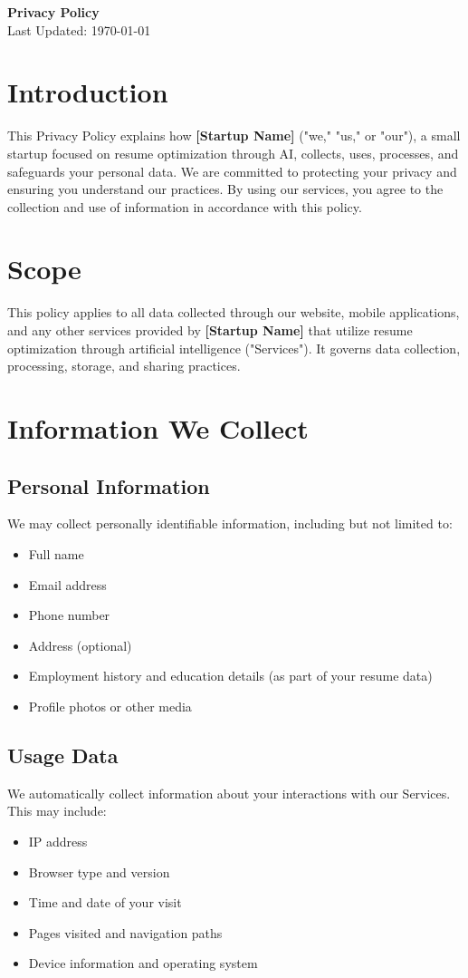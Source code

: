 \documentclass[12pt]{article}
\begin{document}
\begin{center}
    {\LARGE \textbf{Privacy Policy}}\\[0.5cm]
    {\large Last Updated: \today}
\end{center}

\vspace{1cm}

\section{Introduction}
This Privacy Policy explains how \textbf{[Startup Name]} ("we," "us," or "our"), a small startup focused on resume optimization through AI, collects, uses, processes, and safeguards your personal data. We are committed to protecting your privacy and ensuring you understand our practices. By using our services, you agree to the collection and use of information in accordance with this policy.

\section{Scope}
This policy applies to all data collected through our website, mobile applications, and any other services provided by \textbf{[Startup Name]} that utilize resume optimization through artificial intelligence ("Services"). It governs data collection, processing, storage, and sharing practices.

\section{Information We Collect}
\subsection{Personal Information}
We may collect personally identifiable information, including but not limited to:
\begin{itemize}
    \item Full name
    \item Email address
    \item Phone number
    \item Address (optional)
    \item Employment history and education details (as part of your resume data)
    \item Profile photos or other media
\end{itemize}

\subsection{Usage Data}
We automatically collect information about your interactions with our Services. This may include:
\begin{itemize}
    \item IP address
    \item Browser type and version
    \item Time and date of your visit
    \item Pages visited and navigation paths
    \item Device information and operating system
\end{itemize}
\end{document}
